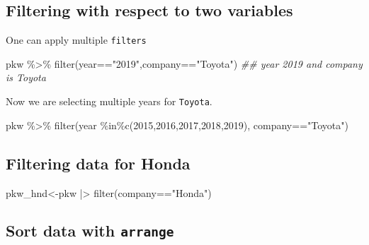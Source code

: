 \documentclass[
  letterpaper,
  DIV=11,
  numbers=noendperiod]{scrartcl}
\newenvironment{Shaded}{\begin{snugshade}}{\end{snugshade}}
\newcommand{\DecValTok}[1]{\textcolor[rgb]{0.68,0.00,0.00}{#1}}
\newcommand{\DocumentationTok}[1]{\textcolor[rgb]{0.37,0.37,0.37}{\textit{#1}}}
\newcommand{\FunctionTok}[1]{\textcolor[rgb]{0.28,0.35,0.67}{#1}}
\newcommand{\NormalTok}[1]{\textcolor[rgb]{0.00,0.23,0.31}{#1}}
\newcommand{\OtherTok}[1]{\textcolor[rgb]{0.00,0.23,0.31}{#1}}
\newcommand{\SpecialCharTok}[1]{\textcolor[rgb]{0.37,0.37,0.37}{#1}}
\newcommand{\StringTok}[1]{\textcolor[rgb]{0.13,0.47,0.30}{#1}}
\begin{document}
\hypertarget{filtering-with-respect-to-two-variables}{%
\subsection{Filtering with respect to two
variables}\label{filtering-with-respect-to-two-variables}}

One can apply multiple \texttt{filters}

\begin{Shaded}
\begin{Highlighting}[]
\NormalTok{pkw }\SpecialCharTok{\%\textgreater{}\%} \FunctionTok{filter}\NormalTok{(year}\SpecialCharTok{==}\StringTok{"2019"}\NormalTok{,company}\SpecialCharTok{==}\StringTok{"Toyota"}\NormalTok{) }\DocumentationTok{\#\# year 2019 and company is Toyota}
\end{Highlighting}
\end{Shaded}

Now we are selecting multiple years for \texttt{Toyota}.

\begin{Shaded}
\begin{Highlighting}[]
\NormalTok{pkw }\SpecialCharTok{\%\textgreater{}\%} \FunctionTok{filter}\NormalTok{(year }\SpecialCharTok{\%in\%}\FunctionTok{c}\NormalTok{(}\DecValTok{2015}\NormalTok{,}\DecValTok{2016}\NormalTok{,}\DecValTok{2017}\NormalTok{,}\DecValTok{2018}\NormalTok{,}\DecValTok{2019}\NormalTok{), company}\SpecialCharTok{==}\StringTok{"Toyota"}\NormalTok{) }
\end{Highlighting}
\end{Shaded}

\hypertarget{filtering-data-for-honda}{%
\subsection{Filtering data for Honda}\label{filtering-data-for-honda}}

\begin{Shaded}
\begin{Highlighting}[]
\NormalTok{pkw\_hnd}\OtherTok{\textless{}{-}}\NormalTok{pkw }\SpecialCharTok{|\textgreater{}} \FunctionTok{filter}\NormalTok{(company}\SpecialCharTok{==}\StringTok{"Honda"}\NormalTok{)}
\end{Highlighting}
\end{Shaded}

\hypertarget{sort-data-with-arrange}{%
\subsection{\texorpdfstring{Sort data with
\texttt{arrange}}{Sort data with arrange}}\label{sort-data-with-arrange}}
\end{document}

